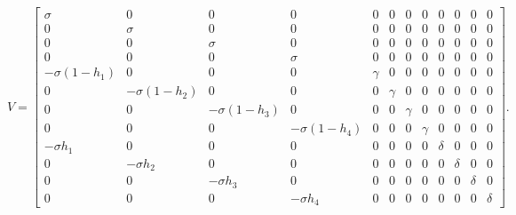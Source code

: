 \documentclass[10pt]{article}
\begin{document}
\begin{equation} \tag{A21}
V=\left[\begin{array}{cccccccccccc}
\sigma & 0 & 0 & 0 & 0 & 0 & 0 & 0 & 0 & 0 & 0 & 0\\
0 & \sigma & 0 & 0 & 0 & 0 & 0 & 0 & 0 & 0 & 0 & 0\\
0 & 0 & \sigma & 0 & 0 & 0 & 0 & 0 & 0 & 0 & 0 & 0\\
0 & 0 & 0 & \sigma & 0 & 0 & 0 & 0 & 0 & 0 & 0 & 0\\
-\sigma (1-h_1) & 0 & 0 & 0 & \gamma & 0 & 0 & 0& 0 & 0 & 0 & 0 \\
0 & -\sigma (1-h_2) & 0 & 0 & 0 & \gamma & 0 & 0& 0 & 0 & 0 & 0 \\
0 & 0 & -\sigma (1-h_3) & 0 & 0 & 0 & \gamma & 0& 0 & 0 & 0 & 0 \\
0 & 0 & 0 & -\sigma (1-h_4) & 0 & 0 & 0 &\gamma& 0 & 0 & 0 & 0 \\
-\sigma h_1 & 0 & 0 & 0 & 0 & 0 & 0 & 0 & \delta & 0 & 0 & 0\\
0 & -\sigma h_2 & 0 & 0 & 0 & 0 & 0 & 0 & 0 & \delta & 0 & 0\\
0 & 0 & -\sigma h_3 & 0 & 0 & 0 & 0 & 0 & 0 & 0 & \delta& 0\\
0 & 0 & 0 & -\sigma h_4 & 0 & 0 & 0 & 0 & 0 & 0 & 0 & \delta
\end{array}\right].
\end{equation}
\end{document}
